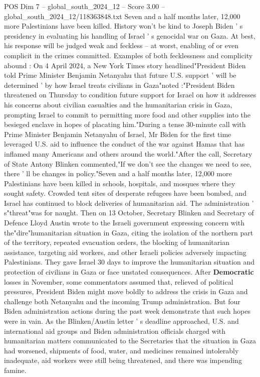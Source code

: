 \begin{textsample}{POS Dim 7 – global\_south\_2024\_12 – Score 3.00 – global\_south\_2024\_12/118363848.txt}  \label{ex:f7_pos_356}
Seven and a half months later, 12,000 more Palestinians have been killed.
History won't be kind to Joseph Biden ' s presidency in evaluating his handling of Israel ' s genocidal war on Gaza.
At best, his response will be judged weak and feckless -- at worst, enabling of or even complicit in the crimes committed.
Examples of both fecklessness and complicity abound : On 4 April 2024, a New York Times story headlined"President Biden told Prime Minister Benjamin Netanyahu that future U.S. support ' will be determined ' by how Israel treats civilians in Gaza"noted :"President Biden threatened on Thursday to condition future support for Israel on how it addresses his concerns about civilian casualties and the humanitarian crisis in Gaza, prompting Israel to commit to permitting more food and other supplies into the besieged enclave in hopes of placating him."During a tense 30-minute call with Prime Minister Benjamin Netanyahu of Israel, Mr Biden for the first time leveraged U.S. aid to influence the conduct of the war against Hamas that has inflamed many Americans and others around the world."After the call, Secretary of State Antony Blinken commented,"If we don't see the changes we need to see, there ' ll be changes in policy."Seven and a half months later, 12,000 more Palestinians have been killed in schools, hospitals, and mosques where they sought safety.
Crowded tent sites of desperate refugees have been bombed, and Israel has continued to block deliveries of humanitarian aid.
The administration ' s"threat"was for naught.
Then on 13 October, Secretary Blinken and Secretary of Defence Lloyd Austin wrote to the Israeli government expressing concern with the"dire"humanitarian situation in Gaza, citing the isolation of the northern part of the territory, repeated evacuation orders, the blocking of humanitarian assistance, targeting aid workers, and other Israeli policies adversely impacting Palestinians.
They gave Israel 30 days to improve the humanitarian situation and protection of civilians in Gaza or face unstated consequences.
After \textbf{Democratic} losses in November, some commentators assumed that, relieved of political pressures, President Biden might move boldly to address the crisis in Gaza and challenge both Netanyahu and the incoming Trump administration.
But four Biden administration actions during the past week demonstrate that such hopes were in vain.
As the Blinken/Austin letter ' s deadline approached, U.S. and international aid groups and Biden administration officials charged with humanitarian matters communicated to the Secretaries that the situation in Gaza had worsened, shipments of food, water, and medicines remained intolerably inadequate, aid workers were still being threatened, and there was impending famine.

\end{textsample}
